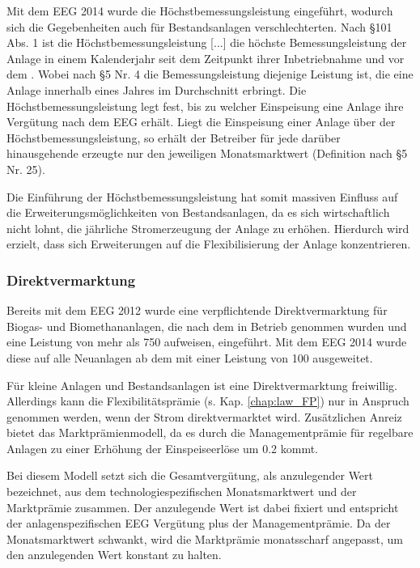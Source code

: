 Mit dem \gls{EEG} \SI{2014}{\relax} wurde die Höchstbemessungsleistung eingeführt, wodurch sich die Gegebenheiten auch für Bestandsanlagen verschlechterten. Nach \S 101 Abs. 1 ist die \glqq Höchstbemessungsleistung [...] die höchste Bemessungsleistung der Anlage in einem Kalenderjahr seit dem Zeitpunkt ihrer Inbetriebnahme und vor dem .\grqq{} Wobei nach \S 5 Nr. 4 die Bemessungsleistung diejenige Leistung ist, die eine Anlage innerhalb eines Jahres im Durchschnitt erbringt. \parencite{BJV2014a} Die Höchstbemessungsleistung legt fest, bis zu welcher Einspeisung eine Anlage ihre Vergütung nach dem \gls{EEG} erhält. Liegt die Einspeisung einer Anlage über der Höchstbemessungsleistung, so erhält der Betreiber für jede darüber hinausgehende erzeugte \si{\kwh} nur den jeweiligen Monatsmarktwert (Definition nach \S 5 Nr. 25). \parencite{Loibl2014}\smallskip

Die Einführung der Höchstbemessungsleistung hat somit massiven Einfluss auf die Erweiterungsmöglichkeiten von Bestandsanlagen, da es sich wirtschaftlich nicht lohnt, die jährliche Stromerzeugung der Anlage zu erhöhen. Hierdurch wird erzielt, dass sich Erweiterungen auf die Flexibilisierung der Anlage konzentrieren. \parencite{DanielGromke2019}


\subsubsection{Direktvermarktung}\label{chap:law_DV}

Bereits mit dem \gls{EEG} \SI{2012}{\relax} wurde eine verpflichtende Direktvermarktung für Biogas- und Biomethananlagen, die nach dem  in Betrieb genommen wurden und eine Leistung von mehr als \SI{750}{\kw} aufweisen, eingeführt. Mit dem \gls{EEG} \SI{2014}{\relax} wurde diese auf alle Neuanlagen ab dem  mit einer Leistung von \SI{100}{\kw} ausgeweitet.\smallskip

Für kleine Anlagen und Bestandsanlagen ist eine Direktvermarktung freiwillig. Allerdings kann die Flexibilitätsprämie (s. Kap. \ref{chap:law_FP}) nur in Anspruch genommen werden, wenn der Strom direktvermarktet wird. Zusätzlichen Anreiz bietet das Marktprämienmodell, da es durch die Managementprämie für regelbare Anlagen zu einer Erhöhung der Einspeiseerlöse um \SI[per-mode=symbol]{0.2}{\ctkwh} kommt.\smallskip

Bei diesem Modell setzt sich die Gesamtvergütung, als anzulegender Wert bezeichnet, aus dem technologiespezifischen Monatsmarktwert und der Marktprämie zusammen. Der anzulegende Wert ist dabei fixiert und entspricht der anlagenspezifischen \gls{EEG} Vergütung plus der Managementprämie. Da der Monatsmarktwert schwankt, wird die Marktprämie monatsscharf angepasst, um den anzulegenden Wert konstant zu halten. \parencite{NKGH-DV}


